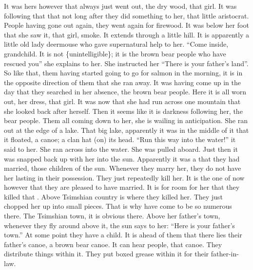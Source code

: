 \begin{pairs}
\begin{Rightside}
It was hers however that always just went out, the dry wood, that girl.
It was following that that not long after they did something to her, that little aristocrat.
\pend
\pstart
{}People having gone out again, they went again for firewood.
It was below her foot that she saw it, that girl, smoke.
It extends through a little hill.
It is apparently a little old lady deermouse who gave supernatural help to her.
\qqk{}“Come inside, grandchild.
It is not \{unintelligible\};
it is the brown bear people who have rescued you”
she explains to her.
She instructed her “There is your father’s land”.
So like that, them having started going to go for salmon in the morning,
it is in the opposite direction of them that she ran away.
It was having come up in the day that they searched in her absence, the brown bear people.
Here it is all worn out, her dress, that girl.
It was now that she had run across one mountain that she looked back after herself.
Then it seems like it is darkness following her, the bear people.
Them all coming down to her, she is wailing in anticipation.
She ran out at the edge of a lake.
That big lake, apparently it was in the middle of it that it floated, a canoe; a clan hat (on) its head.
\qqk{}“Run this way into the water!” it said to her.
She ran across into the water.
She was pulled aboard.
Just then it was snapped back up with her into the sun.
\pend
\pstart
{}Apparently it was a  that they had married, those children of the sun.
Whenever they marry her, they do not have her lasting in their possession.
They just repeatedly kill her.
It is the one of now however that they are pleased to have married.
It is for room for her that they killed that .
Above Tsim\-shian country is where they killed her.
They just chopped her up into small pieces.
That is why  have come to be so numerous there.
The Tsimshian town, it is obvious there.
Above her father’s town, whenever they fly around above it, the sun says to her:
\qqk{}“Here is your father’s town.”
At some point they have a child.
It is ahead of them that there lies their father’s canoe, a brown bear canoe.
It can hear people, that canoe.
They distribute things within it.
They put boxed grease within it for their father-in-law.

\end{Rightside}
\end{pairs}
